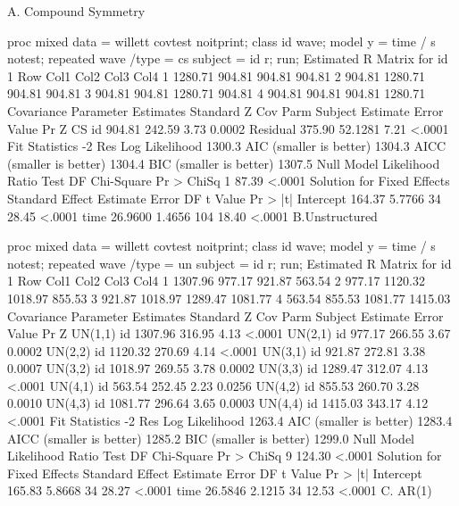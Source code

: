 A. Compound Symmetry

proc mixed data = willett covtest noitprint;
  class id wave;
  model y = time / s notest;
  repeated wave /type = cs subject = id r;
run;
             Estimated R Matrix for id 1
 Row        Col1        Col2        Col3        Col4
   1     1280.71      904.81      904.81      904.81
   2      904.81     1280.71      904.81      904.81
   3      904.81      904.81     1280.71      904.81
   4      904.81      904.81      904.81     1280.71
                  Covariance Parameter Estimates
                                    Standard         Z
Cov Parm     Subject    Estimate       Error     Value        Pr Z
CS           id           904.81      242.59      3.73      0.0002
Residual                  375.90     52.1281      7.21      <.0001
           Fit Statistics
-2 Res Log Likelihood          1300.3
AIC (smaller is better)        1304.3
AICC (smaller is better)       1304.4
BIC (smaller is better)        1307.5
  Null Model Likelihood Ratio Test
    DF    Chi-Square      Pr > ChiSq
     1         87.39          <.0001
                   Solution for Fixed Effects
                         Standard
Effect       Estimate       Error      DF    t Value    Pr > |t|
Intercept      164.37      5.7766      34      28.45      <.0001
time          26.9600      1.4656     104      18.40      <.0001
B.Unstructured

proc mixed data = willett covtest noitprint;
  class id wave;
  model y = time / s notest;
  repeated wave /type = un subject = id r;
run;
             Estimated R Matrix for id 1
 Row        Col1        Col2        Col3        Col4
   1     1307.96      977.17      921.87      563.54
   2      977.17     1120.32     1018.97      855.53
   3      921.87     1018.97     1289.47     1081.77
   4      563.54      855.53     1081.77     1415.03
                 Covariance Parameter Estimates
                                   Standard         Z
Cov Parm    Subject    Estimate       Error     Value        Pr Z
UN(1,1)     id          1307.96      316.95      4.13      <.0001
UN(2,1)     id           977.17      266.55      3.67      0.0002
UN(2,2)     id          1120.32      270.69      4.14      <.0001
UN(3,1)     id           921.87      272.81      3.38      0.0007
UN(3,2)     id          1018.97      269.55      3.78      0.0002
UN(3,3)     id          1289.47      312.07      4.13      <.0001
UN(4,1)     id           563.54      252.45      2.23      0.0256
UN(4,2)     id           855.53      260.70      3.28      0.0010
UN(4,3)     id          1081.77      296.64      3.65      0.0003
UN(4,4)     id          1415.03      343.17      4.12      <.0001
           Fit Statistics
-2 Res Log Likelihood          1263.4
AIC (smaller is better)        1283.4
AICC (smaller is better)       1285.2
BIC (smaller is better)        1299.0
  Null Model Likelihood Ratio Test
    DF    Chi-Square      Pr > ChiSq
     9        124.30          <.0001
                   Solution for Fixed Effects
                         Standard
Effect       Estimate       Error      DF    t Value    Pr > |t|
Intercept      165.83      5.8668      34      28.27      <.0001
time          26.5846      2.1215      34      12.53      <.0001
C. AR(1)

